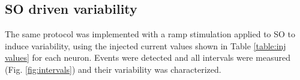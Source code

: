 \subsection{SO driven variability}
\label{subsec:so driven}

The same protocol was implemented with a ramp stimulation applied to SO to induce variability, using the injected current values shown in Table \ref{table:inj values} for each neuron. Events were detected and all intervals were measured (Fig. \ref{fig:intervals}) and their variability was characterized. %

